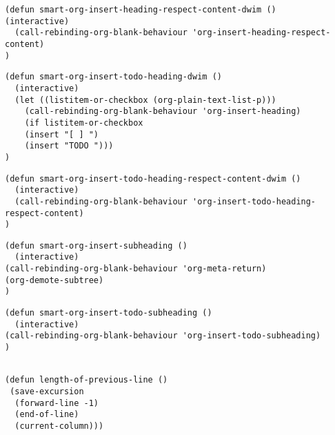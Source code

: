 \documentclass[11pt]{article}
\begin{document}
\label{sec:org08ea973}
\begin{verbatim}
(defun smart-org-insert-heading-respect-content-dwim ()
(interactive)
  (call-rebinding-org-blank-behaviour 'org-insert-heading-respect-content)
)
\end{verbatim}

\label{sec:org9682cf8}
\begin{verbatim}
(defun smart-org-insert-todo-heading-dwim ()
  (interactive)
  (let ((listitem-or-checkbox (org-plain-text-list-p)))
    (call-rebinding-org-blank-behaviour 'org-insert-heading)
    (if listitem-or-checkbox
	(insert "[ ] ")
	(insert "TODO ")))
)

\end{verbatim}

\label{sec:org8bbacf9}
\begin{verbatim}
(defun smart-org-insert-todo-heading-respect-content-dwim ()
  (interactive)
  (call-rebinding-org-blank-behaviour 'org-insert-todo-heading-respect-content)
)
\end{verbatim}

\label{sec:orgd55ec5f}
\begin{verbatim}
(defun smart-org-insert-subheading ()
  (interactive)
(call-rebinding-org-blank-behaviour 'org-meta-return)
(org-demote-subtree)
)
\end{verbatim}

\label{sec:org5185f9b}
\begin{verbatim}
(defun smart-org-insert-todo-subheading ()
  (interactive)
(call-rebinding-org-blank-behaviour 'org-insert-todo-subheading)
)
\end{verbatim}
\label{sec:orgdf09ab9}
\begin{verbatim}

(defun length-of-previous-line ()
 (save-excursion
  (forward-line -1)
  (end-of-line)
  (current-column)))
\end{verbatim}
\end{document}
